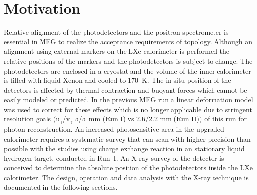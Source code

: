 \section{\label{motivation}Motivation}
Relative alignment of the photodetectors and the positron
spectrometer is essential in MEG to realize the acceptance
requirements of \mueg topology.  Although an alignment
using external markers on the LXe calorimeter is performed the
relative positions of the markers and the photodetectors is
subject to change. The photodetectors are enclosed in a
cryostat and the volume of the inner 
calorimeter is filled with liquid Xenon and cooled to 170~K. 
The in-situ position of the
detectors is affected by thermal contraction and buoyant
forces which cannot be easily modeled or predicted. In the
previous MEG run a linear deformation model was used to
correct for these effects which is no longer applicable due
to stringent resolution goals\cite{megdesign,megproposal}
(u$_\gamma$/v$_\gamma$ 5/5~mm (Run I) vs 2.6/2.2 mm (Run II))
of this run for photon reconstruction.  An increased photosensitive
area in the upgraded calorimeter requires a systematic survey
that can scan with higher precision than possible with the
studies using charge exchange reaction \cex in an stationary
liquid hydrogen target, conducted in Run~I.  An X-ray survey of
the detector is conceived to determine the absolute position
of the photodetectors inside the LXe calorimeter. The design,
operation and data analysis with the X-ray technique is
documented in the following sections.



